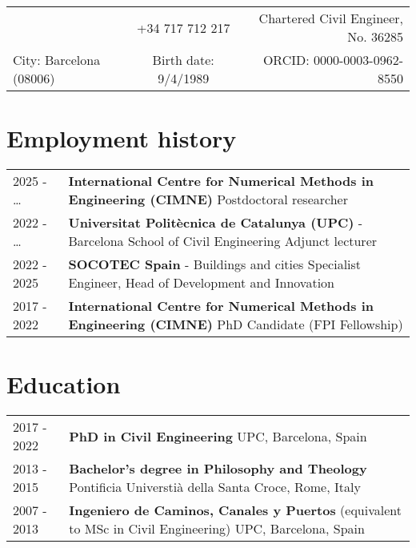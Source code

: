 \documentclass[12pt]{article}
\author{Miguel Masó, PhD}
\begin{document}
\maketitle
\begin{tabularx}{\linewidth}{lCr}
 &
+34 717 712 217 &
Chartered Civil Engineer, No. 36285\\[-.2em]
City: Barcelona (08006) &
Birth date: 9/4/1989 &
ORCID: 0000-0003-0962-8550    
\end{tabularx}


\section{Employment history}
\begin{tabularx}{\linewidth}{lX}
    2025 - \enspace \dots &
    \textbf{International Centre for Numerical Methods in Engineering (CIMNE)} \newline
    Postdoctoral researcher \\

    2022 - \enspace \dots &
    \textbf{Universitat Politècnica de Catalunya (UPC)} - Barcelona School of Civil Engineering \newline
    Adjunct lecturer \\ 

    2022 - 2025 &
    \textbf{SOCOTEC Spain} - Buildings and cities \newline
    Specialist Engineer, Head of Development and Innovation \\

    2017 - 2022 &
    \textbf{International Centre for Numerical Methods in Engineering (CIMNE)} \newline
    PhD Candidate (FPI Fellowship) \\
\end{tabularx}


\section{Education}
\begin{tabularx}{\linewidth}{lX}
    2017 - 2022 &
    \textbf{PhD in Civil Engineering} \newline
    UPC, Barcelona, Spain \\

    2013 - 2015 &
    \textbf{Bachelor's degree in Philosophy and Theology} \newline
    Pontificia Universtià della Santa Croce, Rome, Italy \\

    2007 - 2013 &
    \textbf{Ingeniero de Caminos, Canales y Puertos} (equivalent to MSc in Civil Engineering) \newline
    UPC, Barcelona, Spain \\
\end{tabularx}
\end{document}
